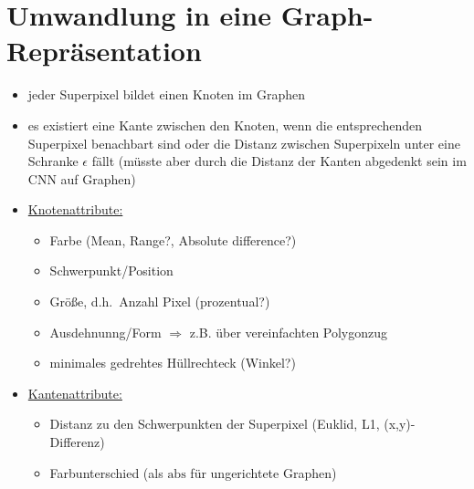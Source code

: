 \section{Umwandlung in eine Graph-Repräsentation}

\begin{itemize}
  \item jeder Superpixel bildet einen Knoten im Graphen
  \item es existiert eine Kante zwischen den Knoten, wenn die entsprechenden Superpixel benachbart sind oder die Distanz zwischen Superpixeln unter eine Schranke $\epsilon$ fällt (müsste aber durch die Distanz der Kanten abgedenkt sein im CNN auf Graphen)
  \item \underline{Knotenattribute:}
  \begin{itemize}
    \item Farbe (Mean, Range?, Absolute difference?)
    \item Schwerpunkt/Position
    \item Größe, d.h.\ Anzahl Pixel (prozentual?)
    \item Ausdehnunng/Form $\Rightarrow$ z.B. über vereinfachten Polygonzug
    \item minimales gedrehtes Hüllrechteck (Winkel?)
  \end{itemize}
  \item \underline{Kantenattribute:}
  \begin{itemize}
    \item Distanz zu den Schwerpunkten der Superpixel (Euklid, L1, (x,y)-Differenz)
    \item Farbunterschied (als $\text{abs}$ für ungerichtete Graphen)
  \end{itemize}
\end{itemize}
